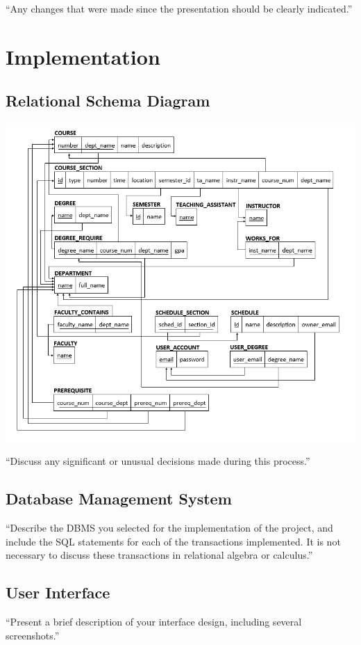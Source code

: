 \documentclass[twoside=false,a4paper,11pt]{article}
\theoremstyle{mytheor}
\begin{document}
``Any changes that were made since the presentation should be clearly indicated.''

\section*{Implementation}

\subsection*{Relational Schema Diagram}

\includegraphics[width=\textwidth]{RelationalSchemaDiagram.png}

``Discuss any significant or unusual decisions made during this process.''

\subsection*{Database Management System}

``Describe the DBMS you selected for the implementation	of the project, and include the SQL statements for each of the transactions implemented. It is not necessary to discuss these transactions in relational algebra or calculus.''

\subsection*{User Interface}

``Present a brief description of your interface design, including several screenshots.''
\end{document}
